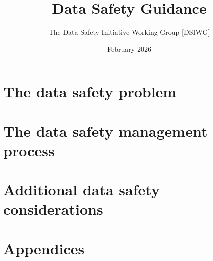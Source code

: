 \title{\textcolor{dsiwgAccentColour}{Data Safety Guidance}}
\author{The Data Safety Initiative Working Group [DSIWG]}
\date{\textcolor{dsiwgAccentColour}{February 2026}}

%
%
%
%
%
%
\ifx\withCovers\undefined
\else
\thispagestyle{empty}%

\fi


\begin{styleTextbody}%
%
%
\frontmatter

\mainmatter
%
%

\part{The data safety problem}



\part{The data safety management process}


%

%



\part{Additional data safety considerations}






\part{Appendices}
\begin{appendices}
\setcounter{tocdepth}{1}






\end{appendices}
\backmatter

\printindex[locationidx]
\printindex
\clearpage%
%

%
%
\end{styleTextbody}

\ifx\withCovers\undefined
\else
\thispagestyle{empty}

\fi
%


